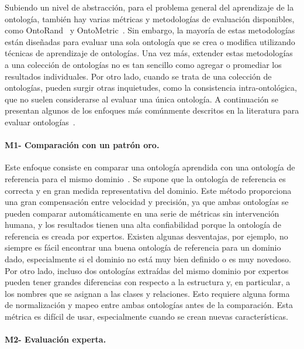 Subiendo un nivel de abstracción, para el problema general del aprendizaje de la ontología, también hay varias métricas y metodologías de evaluación disponibles, como OntoRand~\cite{ontorand} y OntoMetric~\cite{ontometric}.
Sin embargo, la mayoría de estas metodologías están diseñadas para evaluar una sola ontología que se crea o modifica utilizando técnicas de aprendizaje de ontologías.
Una vez más, extender estas metodologías a una colección de ontologías no es tan sencillo como agregar o promediar los resultados individuales.
Por otro lado, cuando se trata de una colección de ontologías, pueden surgir otras inquietudes, como la consistencia intra-ontológica, que no suelen considerarse al evaluar una única ontología.
A continuación se presentan algunos de los enfoques más comúnmente descritos en la literatura para evaluar ontologías~\cite{petasis2011ontology}.

\paragraph{M1- Comparación con un patrón oro.}

Este enfoque consiste en comparar una ontología aprendida con una ontología de referencia para el mismo dominio~\cite{corcoglioniti2016frame}.
Se supone que la ontología de referencia es correcta y en gran medida representativa del dominio.
Este método proporciona una gran compensación entre velocidad y precisión, ya que ambas ontologías se pueden comparar automáticamente en una serie de métricas sin intervención humana, y los resultados tienen una alta confiabilidad porque la ontología de referencia es creada por expertos.
Existen algunas desventajas, por ejemplo, no siempre es fácil encontrar una buena ontología de referencia para un dominio dado, especialmente si el dominio no está muy bien definido o es muy novedoso.
Por otro lado, incluso dos ontologías extraídas del mismo dominio por expertos pueden tener grandes diferencias con respecto a la estructura y, en particular, a los nombres que se asignan a las clases y relaciones.
Esto requiere alguna forma de normalización y mapeo entre ambas ontologías antes de la comparación.
Esta métrica es difícil de usar, especialmente cuando se crean nuevas características.

\paragraph{M2- Evaluación experta.}

